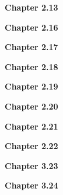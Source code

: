 \documentclass[12pt,letterpaper]{article}
\begin{document}
%
\textbf{Chapter 2.13} \label{sec:chapter2.13}

\textbf{Chapter 2.16} \label{sec:chapter2.16}

\textbf{Chapter 2.17} \label{sec:chapter2.17}

\textbf{Chapter 2.18} \label{sec:chapter2.18}

\textbf{Chapter 2.19} \label{sec:chapter2.19}

\textbf{Chapter 2.20} \label{sec:chapter2.20}

\textbf{Chapter 2.21} \label{sec:chapter2.21}

\textbf{Chapter 2.22} \label{sec:chapter2.22}

\textbf{Chapter 3.23} \label{sec:chapter3.23}

\textbf{Chapter 3.24} \label{sec:chapter3.24}

\end{document}
